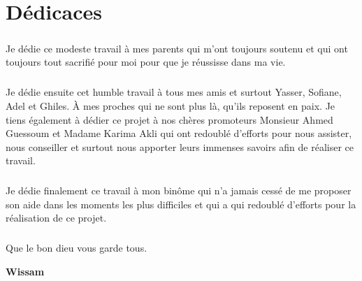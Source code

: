 \chapter*{Dédicaces}    

\vspace{1.5cm}

\paragraph{}
Je dédie ce modeste travail à mes parents qui m'ont toujours soutenu et qui ont toujours tout sacrifié pour moi pour que je réussisse dans ma vie.

\paragraph{}
Je dédie ensuite cet humble travail à tous mes amis et surtout Yasser, Sofiane, Adel et Ghiles. À mes proches qui ne sont plus là, qu'ils reposent en paix. Je tiens également à dédier ce projet à nos chères promoteurs Monsieur Ahmed Guessoum et Madame Karima Akli qui ont redoublé d'efforts pour nous assister, nous conseiller et surtout nous apporter leurs immenses savoirs afin de réaliser ce travail.

\paragraph{}
Je dédie finalement ce travail à mon binôme qui n'a jamais cessé de me proposer son aide dans les moments les plus difficiles et qui a qui redoublé d'efforts pour la réalisation de ce projet.
\paragraph{}
Que le bon dieu vous garde tous.

\vspace{0.5cm}
\begin{center}
	\Large
	\hspace{12.5cm}
	\textbf{Wissam}
\end{center}
